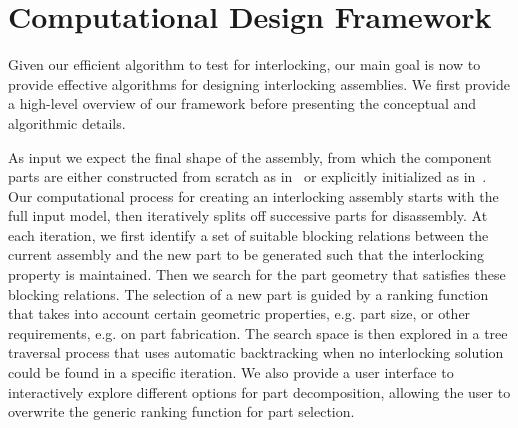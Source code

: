 \section{Computational Design Framework}
\label{sec:approach}



Given our efficient algorithm to test for interlocking, our main goal is now to provide effective algorithms for designing interlocking assemblies. We first provide a high-level overview of our framework before presenting the conceptual and algorithmic details.

As input we expect the final shape of the assembly, from which the component parts are either constructed from scratch as in~\cite{Xin-2011-BurrPuzzles, Song-2012-InterCubes,Song-2015-Interlock} or explicitly initialized as in~\cite{Fu-2015-Furniture, Song-2016-CoFiFab,Yao-2017-InterlockShell}.
%
Our computational process for creating an interlocking assembly starts with the full input model, then iteratively splits off successive parts for disassembly. At each iteration, we first identify a set of suitable blocking relations between the current assembly and the new part to be generated such that the interlocking property is maintained. Then we search for the part geometry that satisfies these blocking relations. The selection of a new part is guided by a ranking function that takes into account certain geometric properties, e.g. part size, or other requirements, e.g. on part fabrication.
The search space is then explored in a tree traversal process that uses automatic backtracking when no interlocking solution could be found in a specific iteration. We also provide a user interface to interactively explore different options for part decomposition, allowing the user to  overwrite the generic ranking function for part selection.




